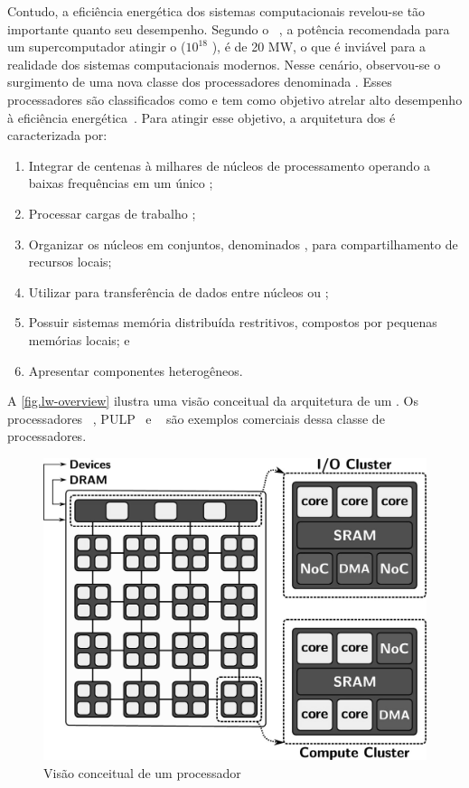 Contudo, a eficiência energética dos sistemas computacionais revelou-se tão importante quanto seu desempenho. Segundo o \darpa~\cite{darpa:exascale}, a potência recomendada para um supercomputador atingir o \exascale ($10^{18}$ \flops), é de 20 MW, o que é inviável para a realidade dos sistemas computacionais modernos. Nesse cenário, observou-se o surgimento de uma nova classe dos processadores denominada \lws. Esses processadores são classificados como \mpsocs e tem como objetivo atrelar alto desempenho à eficiência energética~\cite{francesquini2015}. Para atingir esse objetivo, a arquitetura dos \lws é caracterizada por:
\begin{enumerate}[label=(\roman*)]
    \item Integrar de centenas à milhares de núcleos de processamento operando a baixas frequências em um único \chip;
    \item Processar cargas de trabalho \mimd;
    \item Organizar os núcleos em conjuntos, denominados \clusters, para compartilhamento de recursos locais;
    \item Utilizar \nocs para transferência de dados entre núcleos ou \clusters;
    \item Possuir sistemas memória distribuída restritivos, compostos por pequenas memórias locais; e
    \item Apresentar componentes heterogêneos.
\end{enumerate}
A \autoref{fig.lw-overview} ilustra uma visão conceitual da arquitetura de um \lw. Os processadores \mppa~\cite{dinechin:2013}, PULP~\cite{pulp} e \taihulight~\cite{fu2016sunway} são exemplos comerciais dessa classe de processadores.

\begin{figure}[t]
	\centering
	\includegraphics[width=0.5\linewidth]{content/images/lw-overview-gs.jpg}
	\caption{Visão conceitual de um processador \lw~\cite{penna2021inter}}
    \label{fig.lw-overview}
\end{figure}

